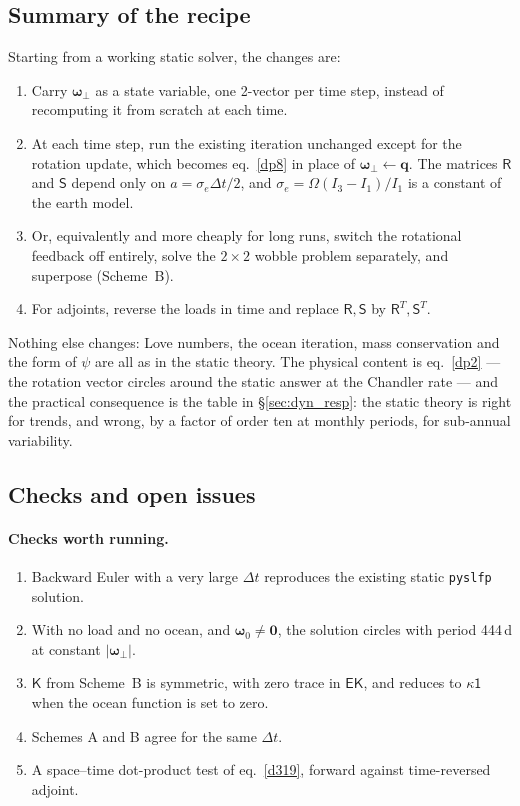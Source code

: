 \documentclass[11pt,a4paper]{article}
\newcommand{\bw}{\bm{\omega}}
\newcommand{\bq}{\mathbf{q}}
\newcommand{\E}{\mathsf{E}}
\newcommand{\Id}{\mathsf{1}}
\newcommand{\R}{\mathsf{R}}
\newcommand{\Sm}{\mathsf{S}}
\newcommand{\K}{\mathsf{K}}
\begin{document}
\subsection{Summary of the recipe}

Starting from a working static solver, the changes are:
\begin{enumerate}
  \item Carry $\bw_\perp$ as a state variable, one 2-vector per time step, instead of recomputing it
  from scratch at each time.
  \item At each time step, run the existing iteration unchanged except for the rotation update,
  which becomes eq.~\eqref{dp8} in place of $\bw_\perp\leftarrow\bq$. The matrices $\R$ and $\Sm$
  depend only on $a=\sigma_e\Delta t/2$, and $\sigma_e=\Omega(I_3-I_1)/I_1$ is a constant of the
  earth model.
  \item Or, equivalently and more cheaply for long runs, switch the rotational feedback off
  entirely, solve the $2\times2$ wobble problem separately, and superpose (Scheme~B).
  \item For adjoints, reverse the loads in time and replace $\R,\Sm$ by $\R^T,\Sm^T$.
\end{enumerate}
Nothing else changes: Love numbers, the ocean iteration, mass conservation and the form of $\psi$
are all as in the static theory. The physical content is eq.~\eqref{dp2} --- the rotation vector
circles around the static answer at the Chandler rate --- and the practical consequence is the table
in \S\ref{sec:dyn_resp}: the static theory is right for trends, and wrong, by a factor of order ten
at monthly periods, for sub-annual variability.

\subsection{Checks and open issues}
\label{sec:dyn_checks}

\paragraph{Checks worth running.}
\begin{enumerate}
  \item Backward Euler with a very large $\Delta t$ reproduces the existing static \texttt{pyslfp}
  solution.
  \item With no load and no ocean, and $\bw_0\neq\mathbf{0}$, the solution circles with period
  444\,d at constant $|\bw_\perp|$.
  \item $\K$ from Scheme~B is symmetric, with zero trace in $\E\K$, and reduces to $\kappa\Id$ when
  the ocean function is set to zero.
  \item Schemes A and B agree for the same $\Delta t$.
  \item A space--time dot-product test of eq.~\eqref{d319}, forward against time-reversed adjoint.
\end{enumerate}
\end{document}
